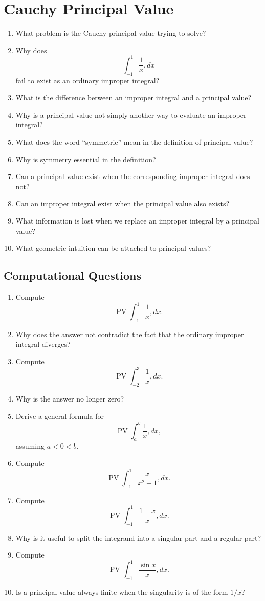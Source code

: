 \section{Cauchy Principal Value}

\begin{enumerate}
  \item What problem is the Cauchy principal value trying to solve?
  \item Why does
    \[
      \int_{-1}^{1}\frac{1}{x},dx
    \]
    fail to exist as an ordinary improper integral?
  \item What is the difference between an improper integral and a principal value?
  \item Why is a principal value not simply another way to evaluate an improper integral?
  \item What does the word ``symmetric'' mean in the definition of principal value?
  \item Why is symmetry essential in the definition?
  \item Can a principal value exist when the corresponding improper integral does not?
  \item Can an improper integral exist when the principal value also exists?
  \item What information is lost when we replace an improper integral by a principal value?
  \item What geometric intuition can be attached to principal values?
\end{enumerate}

\subsection{Computational Questions}

\begin{enumerate}[resume]
  \item Compute
    \[
      \operatorname{PV}\int_{-1}^{1}\frac{1}{x},dx.
    \]
  \item Why does the answer not contradict the fact that the ordinary improper integral diverges?
  \item Compute
    \[
      \operatorname{PV}\int_{-2}^{3}\frac{1}{x},dx.
    \]
  \item Why is the answer no longer zero?
  \item Derive a general formula for
    \[
      \operatorname{PV}\int_a^b\frac{1}{x},dx,
    \]
    assuming \(a<0<b\).
  \item Compute
    \[
      \operatorname{PV}\int_{-1}^{1}\frac{x}{x^2+1},dx.
    \]
  \item Compute
    \[
      \operatorname{PV}\int_{-1}^{1}\frac{1+x}{x},dx.
    \]
  \item Why is it useful to split the integrand into a singular part and a regular part?
  \item Compute
    \[
      \operatorname{PV}\int_{-1}^{1}\frac{\sin x}{x},dx.
    \]
  \item Is a principal value always finite when the singularity is of the form \(1/x\)?
\end{enumerate}

